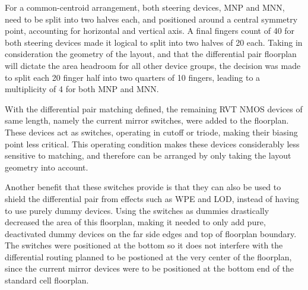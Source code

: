 For a common-centroid arrangement, both steering devices, MNP and MNN, need to be split into two halves each, and positioned around a central symmetry point, accounting for horizontal and vertical axis. A final fingers count of 40 for both steering devices made it logical to split into two halves of 20 each. Taking in consideration the geometry of the layout, and that the differential pair floorplan will dictate the area headroom for all other device groups, the decision was made to split each 20 finger half into two quarters of 10 fingers, leading to a multiplicity of 4 for both MNP and MNN. 

With the differential pair matching defined, the remaining \ac{RVT} NMOS devices of same length, namely the current mirror switches, were added to the floorplan. These devices act as switches, operating in cutoff or triode, making their biasing point less critical. This operating condition makes these devices considerably less sensitive to matching, and therefore can be arranged by only taking the layout geometry into account. 

Another benefit that these switches provide is that they can also be used to shield the differential pair from effects such as \ac{WPE} and \ac{LOD}, instead of having to use purely dummy devices. Using the switches as dummies drastically decreased the area of this floorplan, making it needed to only add pure, deactivated dummy devices on the far side edges and top of floorplan boundary. The switches were positioned at the bottom so it does not interfere with the differential routing planned to be postioned at the very center of the floorplan, since the current mirror devices were to be positioned at the bottom end of the standard cell floorplan.

